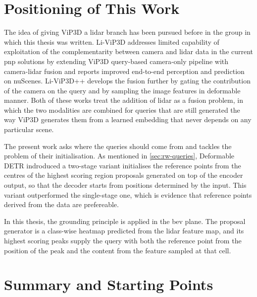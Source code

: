 \section{Positioning of This Work}
\label{sec:rw-positioning}


The idea of giving ViP3D a \ac{lidar} branch has been pursued before in the group in which this thesis was
written. Li-ViP3D \cite{Halinkovic2025LiViP3D} addresses limited capability of exploitation of the complementarity
between camera and \ac{lidar} data in the current \ac{pnp}
solutions by extending ViP3D query-based camera-only pipeline with camera-\ac{lidar} fusion and reports improved
end-to-end perception and prediction on nuScenes. Li-ViP3D++ \cite{Halinkovic2026LiViP3DPP} develops the
fusion further by gating the contribution of the camera on the query and by sampling the image features
in deformable manner. Both of these works treat the addition of \ac{lidar} as a fusion problem, in which the two
modalities are combined for queries that are still generated the way ViP3D generates them from a learned embedding 
that never depends on any particular scene. 

The present work asks where the queries should come from and tackles the problem of their initialisation. 
As mentioned in \ref{sec:rw-queries}, Deformable DETR \cite{Zhu2021DeformableDETR} indroduced a two-stage variant 
initialises the reference points from the centres of the highest scoring region proposals generated
on top of the encoder output, so that the decoder starts from positions determined by
the input. This variant outperformed the single-stage one, which is evidence that reference points derived from the data
are prefereable. 

In this thesis, the grounding principle is applied in the \ac{bev} plane. The proposal generator is a class-wise heatmap
predicted from the \ac{lidar} feature map, and its highest scoring peaks supply the query with both the 
reference point from the position of the peak and the content from the feature sampled at that cell.



\section{Summary and Starting Points}
\label{sec:summary}

